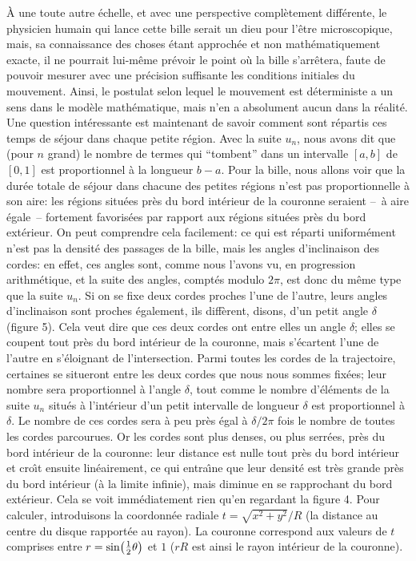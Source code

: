  \medskip 
\`A une toute autre \'echelle, et avec une perspective compl\`etement 
diff\'erente, le physicien humain qui lance cette bille serait un dieu  
pour l'\^etre microscopique, mais, sa connaissance des choses \'etant 
approch\'ee et non math\'ematiquement exacte, il ne pourrait  
lui-m\^eme pr\'evoir le point o\`u la bille s'arr\^etera, faute de pouvoir 
mesurer avec une pr\'ecision suffisante les conditions initiales du 
mouvement. Ainsi, le postulat selon lequel le mouvement est 
d\'eterministe a un sens dans le mod\`ele math\'ematique, mais n'en a 
absolument aucun dans la r\'ealit\'e.  
\medskip 
Une question int\'eressante est maintenant de savoir comment sont 
r\'epartis ces temps de s\'ejour dans chaque petite r\'egion. Avec la  
suite $u_n$, nous avons dit que (pour $n$ grand) le nombre de termes  
qui ``tombent'' dans un intervalle $[a,b]$ de $[0,1]$ est proportionnel  
\`a la longueur $b-a$. Pour la bille, nous allons voir que la dur\'ee  
totale de s\'ejour dans chacune des petites r\'egions n'est pas 
proportionnelle \`a son aire: les r\'egions situ\'ees pr\`es du bord 
int\'erieur de la couronne seraient --~\`a aire \'egale~-- fortement 
favoris\'ees par rapport aux r\'egions situ\'ees pr\`es du bord 
ext\'erieur. On peut comprendre cela facilement:  ce qui est r\'eparti 
uniform\'ement n'est pas la densit\'e des passages de la bille, mais les 
angles d'inclinaison des cordes: en effet, ces angles sont, comme nous 
l'avons vu, en progression arithm\'etique, et la suite des angles, 
compt\'es modulo $2\pi$, est donc du m\^eme type que la suite $u_n$.  
Si on se fixe deux cordes  proches l'une de l'autre, leurs angles  
d'inclinaison sont proches \'egalement, ils diff\`erent, disons, d'un  
petit angle $\delta$ (figure 5). Cela veut dire que ces deux cordes ont 
entre elles un angle  $\delta$; elles se coupent tout pr\`es du bord 
int\'erieur de  la couronne, mais s'\'ecartent l'une de l'autre en 
s'\'eloignant de l'intersection. Parmi toutes les  cordes de la trajectoire, 
certaines se situeront entre les deux cordes que nous nous sommes 
fix\'ees; leur nombre sera proportionnel \`a l'angle $\delta$,  tout comme 
le nombre d'\'el\'ements de la suite $u_n$  situ\'es \`a l'int\'erieur d'un 
petit intervalle de longueur $\delta$ est proportionnel \`a $\delta$. Le 
nombre de ces cordes sera \`a peu pr\`es \'egal \`a $\delta /2\pi$ fois 
le nombre de toutes les cordes parcourues. Or les cordes sont plus 
denses, ou plus serr\'ees, pr\`es du bord  int\'erieur de la couronne: leur 
distance est nulle tout pr\`es du bord int\'erieur et cro\^\i t ensuite 
lin\'eairement, ce qui entra\^\i ne que leur densit\'e est tr\`es grande 
pr\`es du bord int\'erieur (\`a la limite infinie), mais  diminue en se 
rapprochant du bord ext\'erieur. Cela se voit imm\'ediatement  rien 
qu'en regardant la  figure 4.   
\medskip  
Pour calculer, introduisons la coordonn\'ee radiale $t = \sqrt{x^2 + y^2}  
/ R$ (la distance au centre du disque rapport\'ee au rayon). La couronne 
correspond aux valeurs de $t$ comprises entre $r=\sin\bigl( {1\over 2} 
\theta\bigr)$ et $1$ ($rR$ est ainsi le rayon int\'erieur de la couronne). 
\medskip 
 
